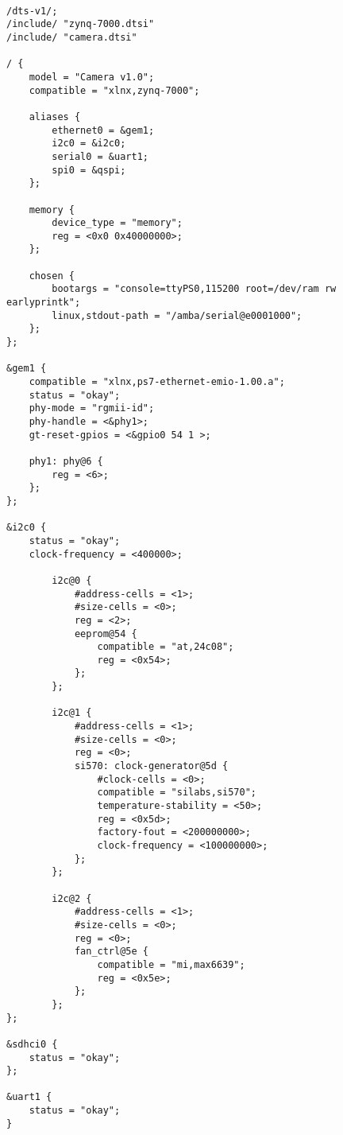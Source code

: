 \begin{lstlisting}

/dts-v1/;
/include/ "zynq-7000.dtsi"
/include/ "camera.dtsi"

/ {
    model = "Camera v1.0";
    compatible = "xlnx,zynq-7000";

    aliases {
        ethernet0 = &gem1;
        i2c0 = &i2c0;
        serial0 = &uart1;
        spi0 = &qspi;
    };

    memory {
        device_type = "memory";
        reg = <0x0 0x40000000>;
    };

    chosen {
        bootargs = "console=ttyPS0,115200 root=/dev/ram rw earlyprintk";
        linux,stdout-path = "/amba/serial@e0001000";
    };
};

&gem1 {
    compatible = "xlnx,ps7-ethernet-emio-1.00.a";
    status = "okay";
    phy-mode = "rgmii-id";
    phy-handle = <&phy1>;
    gt-reset-gpios = <&gpio0 54 1 >;

    phy1: phy@6 {
        reg = <6>;
    };
};

&i2c0 {
    status = "okay";
    clock-frequency = <400000>;

        i2c@0 {
            #address-cells = <1>;
            #size-cells = <0>;
            reg = <2>;
            eeprom@54 {
                compatible = "at,24c08";
                reg = <0x54>;
            };
        };

        i2c@1 {
            #address-cells = <1>;
            #size-cells = <0>;
            reg = <0>;
            si570: clock-generator@5d {
                #clock-cells = <0>;
                compatible = "silabs,si570";
                temperature-stability = <50>;
                reg = <0x5d>;
                factory-fout = <200000000>;
                clock-frequency = <100000000>;
            };
        };

        i2c@2 {
            #address-cells = <1>;
            #size-cells = <0>;
            reg = <0>;
            fan_ctrl@5e {
                compatible = "mi,max6639";
                reg = <0x5e>;
            };
        };
};

&sdhci0 {
    status = "okay";
};

&uart1 {
    status = "okay";
}
\end{lstlisting}



